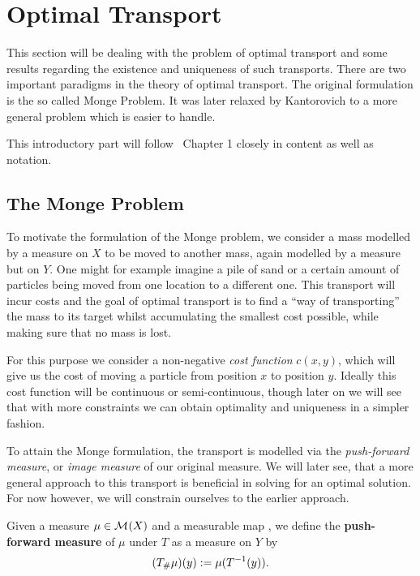 \chapter{Optimal Transport}\label{OT}

This section will be dealing with the problem of optimal transport and some results regarding the existence and uniqueness of such transports. There are two important paradigms in the theory of optimal transport. The original formulation is the so called Monge Problem. It was later relaxed by Kantorovich to a more general problem which is easier to handle.

This introductory part will follow~\cite{San2015} Chapter 1 closely in content as well as notation.

\section{The Monge Problem}\label{TheMonProb}
To motivate the formulation of the Monge problem, we consider a mass modelled by a measure on $X$ to be moved to another mass, again modelled by a measure but on $Y$. One might for example imagine a pile of sand or a certain amount of particles being moved from one location to a different one. This transport will incur costs and the goal of optimal transport is to find a ``way of transporting'' the mass to its target whilst accumulating the smallest cost possible, while making sure that no mass is lost.

For this purpose we consider a non-negative \textit{cost function} $c(x, y)$, which will give us the cost of moving a particle from position $x$ to position $y$. Ideally this cost function will be continuous or semi-continuous, though later on we will see that with more constraints we can obtain optimality and uniqueness in a simpler fashion.

To attain the Monge formulation, the transport is modelled via the \textit{push-forward measure}, or \textit{image measure} of our original measure. We will later see, that a more general approach to this transport is beneficial in solving for an optimal solution. For now however, we will constrain ourselves to the earlier approach.

\begin{definition}\label{PushForward}
	Given a measure $\mu \in \mathcal{M}_{}(X)$ and a measurable map , we define the \textbf{push-forward measure} of $\mu$ under $T$ as a measure on $Y$ by
	\[ ({T}_{\#} \mu)(y) := \mu(T^{-1} (y)). \]
\end{definition}

